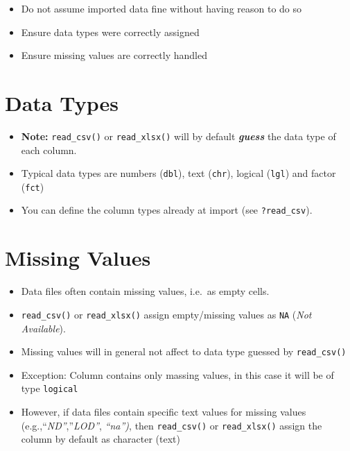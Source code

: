 \documentclass[
  letterpaper,
  DIV=11,
  numbers=noendperiod]{scrreprt}
\providecommand{\tightlist}{%
  \setlength{\itemsep}{0pt}\setlength{\parskip}{0pt}}\usepackage{longtable,booktabs,array}
\begin{document}
\begin{tcolorbox}[enhanced jigsaw, coltitle=black, breakable, bottomrule=.15mm, left=2mm, arc=.35mm, colbacktitle=quarto-callout-note-color!10!white, leftrule=.75mm, colframe=quarto-callout-note-color-frame, colback=white, title=\textcolor{quarto-callout-note-color}{\faInfo}\hspace{0.5em}{Verify integrity of imported data}, titlerule=0mm, opacitybacktitle=0.6, rightrule=.15mm, bottomtitle=1mm, toptitle=1mm, opacityback=0, toprule=.15mm]

\begin{itemize}
\tightlist
\item
  Do not assume imported data fine without having reason to do so
\item
  Ensure data types were correctly assigned
\item
  Ensure missing values are correctly handled
\end{itemize}

\end{tcolorbox}

\hypertarget{data-types}{%
\section{Data Types}\label{data-types}}

\begin{itemize}
\tightlist
\item
  \textbf{Note:} \texttt{read\_csv()} or \texttt{read\_xlsx()} will by
  default \textbf{\emph{guess}} the data type of each column.
\item
  Typical data types are numbers (\texttt{dbl}), text (\texttt{chr}),
  logical (\texttt{lgl}) and factor (\texttt{fct})
\item
  You can define the column types already at import (see
  \texttt{?read\_csv}).
\end{itemize}

\hypertarget{missing-values}{%
\section{Missing Values}\label{missing-values}}

\begin{itemize}
\tightlist
\item
  Data files often contain missing values, i.e.~as empty cells.
\item
  \texttt{read\_csv()} or \texttt{read\_xlsx()} assign empty/missing
  values as \texttt{NA} (\emph{Not Available}).
\item
  Missing values will in general not affect to data type guessed by
  \texttt{read\_csv()}
\item
  Exception: Column contains only massing values, in this case it will
  be of type \texttt{logical}
\item
  However, if data files contain specific text values for missing values
  (e.g.,``\emph{ND''},''\emph{LOD''}, \emph{``na'')}, then
  \texttt{read\_csv()} or \texttt{read\_xlsx()} assign the column by
  default as character (text)
\end{itemize}
\end{document}
